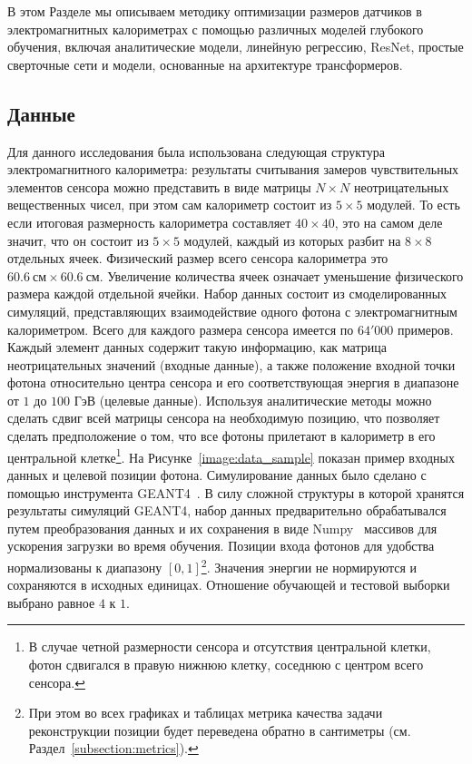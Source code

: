 \documentclass[a4paper,12pt]{extarticle}
\begin{document}
В этом Разделе мы описываем методику оптимизации размеров датчиков в электромагнитных калориметрах с помощью различных моделей глубокого обучения, включая аналитические модели, линейную регрессию, ResNet, простые сверточные сети и модели, основанные на архитектуре трансформеров.

\subsection{Данные}
\label{subsection:data}

Для данного исследования была использована следующая структура электромагнитного калориметра: результаты считывания замеров чувствительных элементов сенсора можно представить в виде матрицы $N \times N$ неотрицательных вещественных чисел, при этом сам калориметр состоит из $5 \times 5$ модулей. То есть если итоговая размерность калориметра составляет $40 \times 40$, это на самом деле значит, что он состоит из $5 \times 5$ модулей, каждый из которых разбит на $8 \times 8$ отдельных ячеек. Физический размер всего сенсора калориметра это $60.6 \: \text{см} \times 60.6 \: \text{см}$. Увеличение количества ячеек означает уменьшение физического размера каждой отдельной ячейки. Набор данных состоит из смоделированных симуляций, представляющих взаимодействие одного фотона с электромагнитным калориметром. Всего для каждого размера сенсора имеется по $64'000$ примеров. Каждый элемент данных содержит такую информацию, как матрица неотрицательных значений (входные данные), а также положение входной точки фотона относительно центра сенсора и его соответствующая энергия в диапазоне от $1$ до $100$ ГэВ (целевые данные). Используя аналитические методы можно сделать сдвиг всей матрицы сенсора на необходимую позицию, что позволяет сделать предположение о том, что все фотоны прилетают в калориметр в его центральной клетке\footnote{В случае четной размерности сенсора и отсутствия центральной клетки, фотон сдвигался в правую нижнюю клетку, соседнюю с центром всего сенсора.}. На Рисунке~\ref{image:data_sample} показан пример входных данных и целевой позиции фотона. Симулирование данных было сделано с помощью инструмента GEANT4~\cite{AGOSTINELLI2003250, ALLISON2016186}. В силу сложной структуры в которой хранятся результаты симуляций GEANT4, набор данных предварительно обрабатывался путем преобразования данных и их сохранения в виде Numpy~\cite{harris2020array} массивов для ускорения загрузки во время обучения. Позиции входа фотонов для удобства нормализованы к диапазону $[0, 1]$\footnote{При этом во всех графиках и таблицах метрика качества задачи реконструкции позиции будет переведена обратно в сантиметры (см. Раздел~\ref{subsection:metrics}).}. Значения энергии не нормируются и сохраняются в исходных единицах. Отношение обучающей и тестовой выборки выбрано равное $4$ к $1$.
\end{document}
